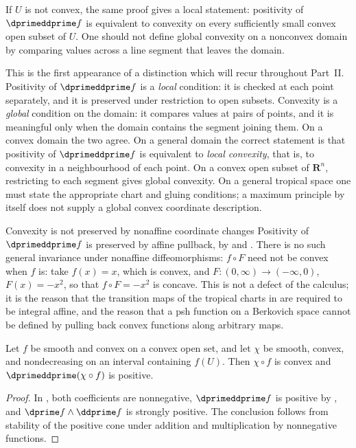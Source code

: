 If $U$ is not convex, the same proof gives a local statement: positivity of
$\dprimeddprime f$ is equivalent to convexity on every sufficiently small
convex open subset of $U$.  One should not define global convexity on a
nonconvex domain by comparing values across a line segment that leaves the
domain.

This is the first appearance of a distinction which will recur throughout
Part~II.  Positivity of $\dprimeddprime f$ is a \emph{local} condition: it is
checked at each point separately, and it is preserved under restriction to
open subsets.  Convexity is a \emph{global} condition on the domain: it
compares values at pairs of points, and it is meaningful only when the domain
contains the segment joining them.  On a convex domain the two agree.  On a
general domain the correct statement is that positivity of
$\dprimeddprime f$ is equivalent to \emph{local convexity}, that is, to
convexity in a neighbourhood of each point.  On a convex open subset of
$\mathbf R^n$, restricting to each segment gives global convexity.
On a general tropical space one must state the appropriate chart and
gluing conditions; a maximum principle by itself does not supply a global
convex coordinate description.

\begin{warning}{Convexity is not preserved by nonaffine coordinate changes}
Positivity of $\dprimeddprime f$ is preserved by affine pullback, by
 and
.  There is no such general invariance
under nonaffine diffeomorphisms: $f\circ F$
need not be convex when $f$ is: take $f(x)=x$, which is convex, and
$F:(0,\infty)\to(-\infty,0)$, $F(x)=-x^2$, so that $f\circ F=-x^2$ is concave.  This is not a
defect of the calculus; it is the reason that the transition maps of the
tropical charts in  are required to be integral
affine, and the reason that a psh function on a Berkovich space cannot be
defined by pulling back convex functions along arbitrary maps.
\end{warning}

\begin{corollary}
\label{cor:superform-convex-composition}
Let $f$ be smooth and convex on a convex open set, and let $\chi$ be smooth,
convex, and nondecreasing on an interval containing $f(U)$. Then
$\chi\circ f$ is convex and $\dprimeddprime(\chi\circ f)$ is positive.
\end{corollary}
\begin{proof}
In , both coefficients are nonnegative,
$\dprimeddprime f$ is positive by , and
$\dprime f\wedge\ddprime f$ is strongly positive.  The conclusion follows
from stability of the positive cone under addition and multiplication by
nonnegative functions.
\end{proof}

